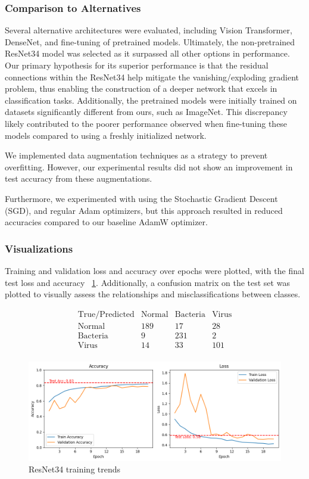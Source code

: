 \documentclass{article}
\begin{document}
\subsubsection{Comparison to Alternatives}
Several alternative architectures were evaluated, including Vision Transformer, DenseNet, and fine-tuning of pretrained models. Ultimately, the non-pretrained ResNet34 model was selected as it surpassed all other options in performance. Our primary hypothesis for its superior performance is that the residual connections within the ResNet34 help mitigate the vanishing/exploding gradient problem, thus enabling the construction of a deeper network that excels in classification tasks. Additionally, the pretrained models were initially trained on datasets significantly different from ours, such as ImageNet. This discrepancy likely contributed to the poorer performance observed when fine-tuning these models compared to using a freshly initialized network.

We implemented data augmentation techniques as a strategy to prevent overfitting. However, our experimental results did not show an improvement in test accuracy from these augmentations. 

Furthermore, we experimented with using the Stochastic Gradient Descent (SGD), and regular Adam optimizers, but this approach resulted in reduced accuracies compared to our baseline AdamW optimizer.

\subsubsection{Visualizations}
Training and validation loss and accuracy over epochs were plotted, with the final test loss and accuracy ~\ref{fig:resnet_training_trends}.
Additionally, a confusion matrix on the test set was plotted to visually assess the relationships and misclassifications between classes.

\[
\begin{array}{c|cccc}
\text{True/Predicted} & \text{Normal} & \text{Bacteria} & \text{Virus} \\
\hline
\text{Normal} & 189 & 17 & 28 \\
\text{Bacteria} & 9 & 231 & 2 \\
\text{Virus} & 14 & 33 & 101 \\
\end{array}
\]


\begin{figure}
  \centering
  \includegraphics[width=0.8\linewidth, angle=0]{resnet_training_trends.png}
  \caption{ResNet34 training trends}
  \label{fig:resnet_training_trends}
\end{figure}
\end{document}
